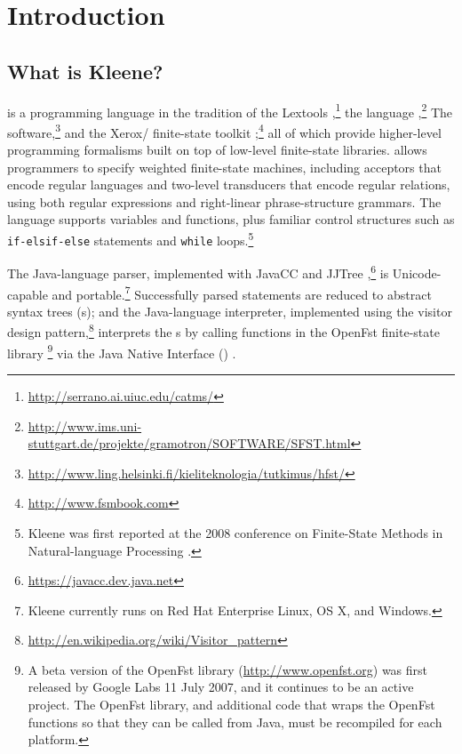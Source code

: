 \chapter{Introduction}

\section{What is Kleene?}

\Kleene{} is a programming language in the
tradition of the 
Lextools \citep{roark+sproat:2007},\footnote{\url{http://serrano.ai.uiuc.edu/catms/}}
the  language
\citep{schmid:2005},\footnote{\url{http://www.ims.uni-stuttgart.de/projekte/gramotron/SOFTWARE/SFST.html}}
The 
software,\footnote{\url{http://www.ling.helsinki.fi/kieliteknologia/tutkimus/hfst/}} and the
Xerox/ finite-state
toolkit \citep{beesley+karttunen:2003};\footnote{\url{http://www.fsmbook.com}} 
all of which provide
higher-level programming formalisms built on top of low-level finite-state
libraries.  \Kleene{} allows programmers to specify weighted
finite-state machines, including acceptors that encode regular
languages and two-level transducers that encode regular relations,
using both regular expressions and right-linear phrase-structure
grammars. The language supports variables and functions, plus
familiar control structures such as \verb!if-elsif-else!
statements and \verb!while!
loops.\footnote{Kleene was first reported at the 2008 conference on
Finite-State Methods in Natural-language Processing \citep{beesley:2009}.}

The Java-language \Kleene{} parser, implemented with JavaCC and
JJTree \citep{copeland:2007},\footnote{\url{https://javacc.dev.java.net}} 
is Unicode-capable and portable.\footnote{Kleene currently runs on Red
Hat Enterprise Linux, OS X, and Windows.}
Successfully parsed statements are reduced to abstract
syntax trees (s); and the Java-language interpreter,
implemented using the visitor design
pattern,\footnote{\url{http://en.wikipedia.org/wiki/Visitor_pattern}} 
interprets the s by calling \CPP{} functions in the
OpenFst finite-state 
library
\citep{allauzen+riley+schalkwyk+skut+mohri:2007}\footnote{A beta version of the 
OpenFst library (\url{http://www.openfst.org})
was first released by Google Labs 11 July 2007, and it continues to be
an active project.  The OpenFst
library, and additional \CPP{} code that wraps the OpenFst functions so that they can
be called from Java, must be recompiled for each platform.} 
via the Java Native Interface
() \citep{gordon:1998,liang:1999}.  

